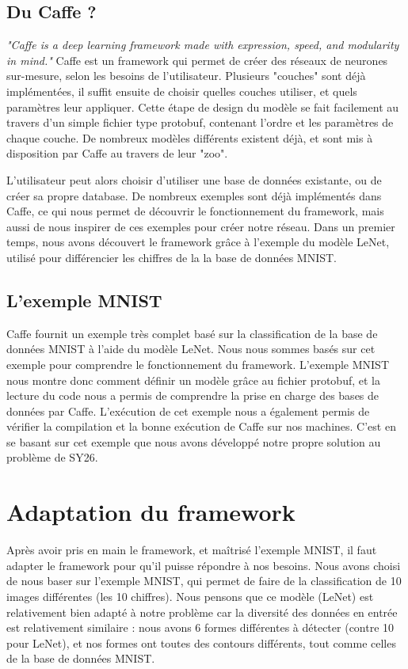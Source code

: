 \documentclass[a4paper,12pt]{article}
\begin{document}
  \subsection{Du Caffe ?}
    \textit{"Caffe is a deep learning framework made with expression, speed, and modularity in mind."}
    Caffe est un framework qui permet de créer des réseaux de neurones sur-mesure, selon les besoins de l'utilisateur. Plusieurs "couches" sont déjà implémentées, il suffit ensuite de choisir quelles couches utiliser, et quels paramètres leur appliquer. Cette étape de design du modèle se fait facilement au travers d'un simple fichier type protobuf, contenant l'ordre et les paramètres de chaque couche. De nombreux modèles différents existent déjà, et sont mis à disposition par Caffe au travers de leur "zoo".

    L'utilisateur peut alors choisir d'utiliser une base de données existante, ou de créer sa propre database. De nombreux exemples sont déjà implémentés dans Caffe, ce qui nous permet de découvrir le fonctionnement du framework, mais aussi de nous inspirer de ces exemples pour créer notre réseau. Dans un premier temps, nous avons découvert le framework grâce à l'exemple du modèle LeNet, utilisé pour différencier les chiffres de la la base de données MNIST.
  
  \subsection{L'exemple MNIST}
    Caffe fournit un exemple très complet basé sur la classification de la base de données MNIST à l'aide du modèle LeNet. Nous nous sommes basés sur cet exemple pour comprendre le fonctionnement du framework. L'exemple MNIST nous montre donc comment définir un modèle grâce au fichier protobuf, et la lecture du code nous a permis de comprendre la prise en charge des bases de données par Caffe.
    L'exécution de cet exemple nous a également permis de vérifier la compilation et la bonne exécution de Caffe sur nos machines. C'est en se basant sur cet exemple que nous avons développé notre propre solution au problème de SY26.

\newpage
\section{Adaptation du framework}
  Après avoir pris en main le framework, et maîtrisé l'exemple MNIST, il faut adapter le framework pour qu'il puisse répondre à nos besoins. Nous avons choisi de nous baser sur l'exemple MNIST, qui permet de faire de la classification de 10 images différentes (les 10 chiffres). Nous pensons que ce modèle (LeNet) est relativement bien adapté à notre problème car la diversité des données en entrée est relativement similaire : nous avons 6 formes différentes à détecter (contre 10 pour LeNet), et nos formes ont toutes des contours différents, tout comme celles de la base de données MNIST. 
\end{document}
